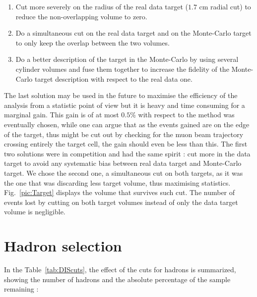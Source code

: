 \begin{enumerate}
  \item Cut more severely on the radius of the real data target ($1.7$ cm radial cut) to reduce the non-overlapping volume to zero.
  \item Do a simultaneous cut on the real data target and on the Monte-Carlo target to only keep the overlap between the two volumes.
  \item Do a better description of the target in the Monte-Carlo by using several cylinder volumes and fuse them together to increase the fidelity of the Monte-Carlo target description with respect to the real data one.
\end{enumerate}

The last solution may be used in the future to maximise the efficiency of the analysis from a statistic point of view but it is heavy and time consuming for a marginal gain. This gain is of at most $0.5$\% with respect to the method was eventually chosen, while one can argue that as the events gained are on the edge of the target, thus might be cut out by checking for the muon beam trajectory crossing entirely the target cell, the gain should even be less than this.
The first two solutions were in competition and had the same spirit : cut more in the data target to avoid any systematic bias between real data target and Monte-Carlo target. We chose the second one, a simultaneous cut on both targets, as it was the one that was discarding less target volume, thus maximising statistics. Fig.~\ref{pic:Target} displays the volume that survives such cut. The number of events lost by cutting on both target volumes instead of only the data target volume is negligible.


\section{Hadron selection}

In the Table~\ref{tab:DIScuts}, the effect of the cuts for hadrons is summarized, showing the number of hadrons and the absolute percentage of the sample remaining :


